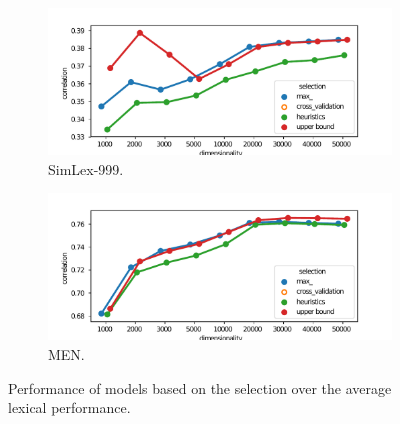 \begin{figure}[b]
  \centering

  \begin{subfigure}[t]{0.49\textwidth}
    \includegraphics[width=\textwidth]{supplement/figures/lexical-results-SimLex999}
    \caption{SimLex-999.}
    \label{fig:lexical-results-simlex}
  \end{subfigure}
  \begin{subfigure}[t]{0.49\textwidth}
    \includegraphics[width=\textwidth]{supplement/figures/lexical-results-men}
    \caption{MEN.}
    \label{fig:lexical-results-men}
  \end{subfigure}

  \caption{Performance of models based on the selection over the average lexical performance.}
  \label{fig:lexical-results}
\end{figure}

